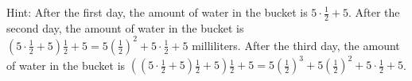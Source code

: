 \documentclass{article}
\begin{document}
\begin{enumerate}
        Hint: After the first day, the amount of water in the
        bucket is $5 \cdot \frac{1}{2} + 5$. After the second day, the amount of
        water in the bucket is $\left(5 \cdot \frac{1}{2} + 5\right)\frac{1}{2}
        + 5 = 5\left(\frac{1}{2}\right)^2 + 5 \cdot \frac{1}{2} + 5$
        milliliters. After the third day, the amount of water in the bucket is
        $\left(\left(5 \cdot \frac{1}{2} + 5\right)\frac{1}{2} +
        5\right)\frac{1}{2} + 5 = 5\left(\frac{1}{2}\right)^3 +
        5\left(\frac{1}{2}\right)^2 + 5 \cdot \frac{1}{2} + 5$.
        \vspace{3cm}
    \end{enumerate}
\end{document}
